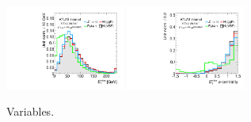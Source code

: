 \begin{figure}[tp]
  \includegraphics[width=0.35\textwidth]{figures/overlaid/boost/met-pt-hi}
  \includegraphics[width=0.35\textwidth]{figures/overlaid/boost/met-phi-centrality}
  \caption{Variables.}
  \label{fig:strategy-overlaid-boost-taus}
\end{figure}
